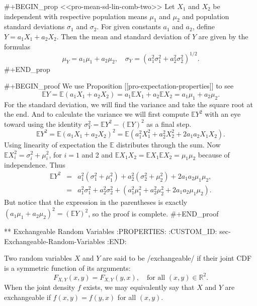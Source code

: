 #+BEGIN_prop
<<pro-mean-sd-lin-comb-two>> Let \(X_{1}\) and \(X_{2}\) be
independent with respective population means \(\mu_{1}\) and
\(\mu_{2}\) and population standard deviations \(\sigma_{1}\) and
\(\sigma_{2}\). For given constants \(a_{1}\) and \(a_{2}\), define
\(Y=a_{1}X_{1}+a_{2}X_{2}\). Then the mean and standard deviation of
\(Y\) are given by the formulas
\begin{equation}
\mu_{Y}=a_{1}\mu_{1}+a_{2}\mu_{2},\quad \sigma_{Y}=\left(a_{1}^{2}\sigma_{1}^{2}+a_{2}^{2}\sigma_{2}^{2}\right)^{1/2}.
\end{equation}
#+END_prop

#+BEGIN_proof
We use Proposition [[pro-expectation-properties]] to see \[ \mathbb{E}
Y=\mathbb{E}\left(a_{1}X_{1}+a_{2}X_{2}\right)=a_{1}\mathbb{E}
X_{1}+a_{2}\mathbb{E} X_{2}=a_{1}\mu_{1}+a_{2}\mu_{2}.  \] For the
standard deviation, we will find the variance and take the square root
at the end. And to calculate the variance we will first compute
\(\mathbb{E} Y^{2}\) with an eye toward using the identity
\(\sigma_{Y}^{2}=\mathbb{E} Y^{2}-\left(\mathbb{E} Y\right)^{2}\) as a
final step.  \[ \mathbb{E}
Y^{2}=\mathbb{E}\left(a_{1}X_{1}+a_{2}X_{2}\right)^{2}=\mathbb{E}\left(a_{1}^{2}X_{1}^{2}+a_{2}^{2}X_{2}^{2}+2a_{1}a_{2}X_{1}X_{2}\right).
\] Using linearity of expectation the \(\mathbb{E}\) distributes
through the sum. Now \(\mathbb{E}
X_{i}^{2}=\sigma_{i}^{2}+\mu_{i}^{2}\), for \(i=1\) and 2 and
\(\mathbb{E} X_{1}X_{2}=\mathbb{E} X_{1}\mathbb{E}
X_{2}=\mu_{1}\mu_{2}\) because of independence. Thus
\begin{eqnarray*}
\mathbb{E} Y^{2} & = & a_{1}^{2}(\sigma_{1}^{2}+\mu_{1}^{2})+a_{2}^{2}(\sigma_{2}^{2}+\mu_{2}^{2})+2a_{1}a_{2}\mu_{1}\mu_{2},\\
 & = & a_{1}^{2}\sigma_{1}^{2}+a_{2}^{2}\sigma_{2}^{2}+\left(a_{1}^{2}\mu_{1}^{2}+a_{2}^{2}\mu_{2}^{2}+2a_{1}a_{2}\mu_{1}\mu_{2}\right).
\end{eqnarray*}
But notice that the expression in the parentheses is exactly
\(\left(a_{1}\mu_{1}+a_{2}\mu_{2}\right)^{2}=\left(\mathbb{E}
Y\right)^{2}\), so the proof is complete.
#+END_proof

** Exchangeable Random Variables
:PROPERTIES:
:CUSTOM_ID: sec-Exchangeable-Random-Variables
:END:

Two random variables \(X\) and \(Y\) are said to be /exchangeable/ if
their joint CDF is a symmetric function of its arguments:
\begin{equation}
F_{X,Y}(x,y)=F_{X,Y}(y,x),\quad \mbox{for all }(x,y)\in\mathbb{R}^{2}.
\end{equation} 
When the joint density \(f\) exists, we may equivalently say that \(X\) and \(Y\) are exchangeable if \(f(x,y)=f(y,x)\) for all \((x,y)\).

